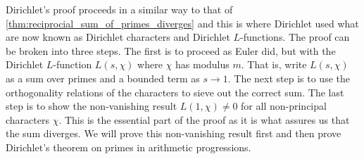       Dirichlet's proof proceeds in a similar way to that of \cref{thm:reciprocial_sum_of_primes_diverges} and this is where Dirichlet used what are now known as Dirichlet characters and Dirichlet $L$-functions. The proof can be broken into three steps. The first is to proceed as Euler did, but with the Dirichlet $L$-function $L(s,\chi)$ where $\chi$ has modulus $m$. That is, write $L(s,\chi)$ as a sum over primes and a bounded term as $s \to 1$. The next step is to use the orthogonality relations of the characters to sieve out the correct sum. The last step is to show the non-vanishing result $L(1,\chi) \neq 0$ for all non-principal characters $\chi$. This is the essential part of the proof as it is what assures us that the sum diverges. We will prove this non-vanishing result first and then prove Dirichlet's theorem on primes in arithmetic progressions.

